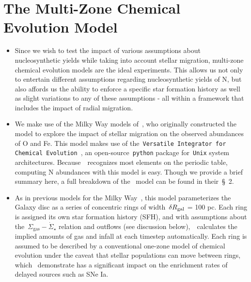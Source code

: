 \documentclass[ms.tex]{subfiles}
\begin{document}
 

\section{The Multi-Zone Chemical Evolution Model} 
\label{sec:methods} 

\begin{itemize} 
	\item Since we wish to test the impact of various assumptions about 
	nucleosynthetic yields while taking into account stellar migration, 
	multi-zone chemical evolution models are the ideal experiments. 
	This allows us not only to entertain different assumptions regarding 
	nucleosynthetic yields of N, but also affords us the ability to enforce a 
	specific star formation history as well as slight variations to any of 
	these assumptions - all within a framework that includes the impact of 
	radial migration. 

	\item We make use of the Milky Way models of~\citet{Johnson2021}, who 
	originally constructed the model to explore the impact of stellar migration 
	on the observed abundances of O and Fe. 
	This model makes use of the~\texttt{Versatile Integrator for Chemical 
	Evolution}~\citep[\vice;][]{Johnson2020, Griffith2021, Johnson2021}, an 
	open-source~\texttt{python} package for~\texttt{Unix} system architectures. 
	Because~\vice~recognizes most elements on the periodic table, computing 
	N abundances with this model is easy. 
	Though we provide a brief summary here, a full breakdown of 
	the~\citet{Johnson2021} model can be found in their~\S~2. 

	\item As in previous models for the Milky Way~\citep[e.g.][]{Matteucci1989, 
	Schoenrich2009, Minchev2013, Minchev2014, Minchev2017, Sharma2020}, this 
	model parameterizes the Galaxy disc as a series of concentric rings of 
	width~$\delta R_\text{gal}$ = 100 pc.
	Each ring is assigned its own star formation history (SFH), and with 
	assumptions about the~$\Sigma_\text{gas}-\dot{\Sigma}_\star$ relation and 
	outflows (see discussion below),~\vice~calculates the implied amounts of 
	gas and infall at each timestep automatically. 
	Each ring is assumed to be described by a conventional one-zone model of 
	chemical evolution under the caveat that stellar populations can move 
	between rings, which~\citet{Johnson2021} demonstrate has a significant 
	impact on the enrichment rates of delayed sources such as SNe Ia. 


\end{itemize}
\end{document}
